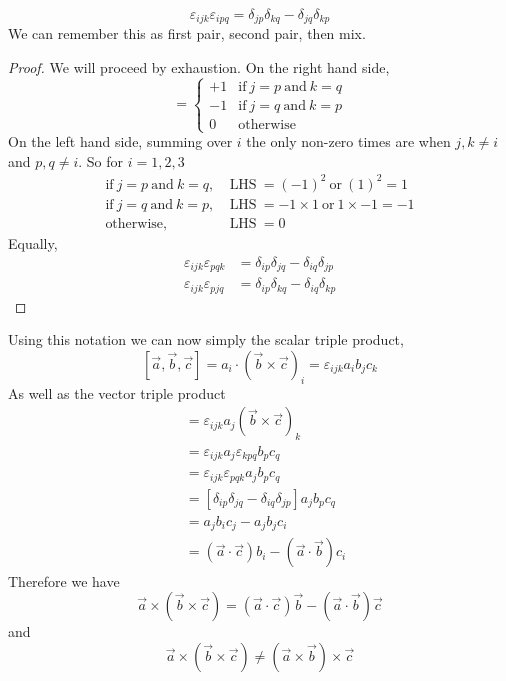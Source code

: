 \documentclass{article}
\numberwithin{equation}{section}
\begin{document}
\begin{remark}
    \begin{equation}
        \varepsilon_{ijk} \varepsilon_{ipq} = \delta_{jp} \delta_{kq} - \delta_{jq} \delta_{kp}   
    \end{equation}
    We can remember this as first pair, second pair, then mix.
\end{remark}

\begin{proof}
    We will proceed by exhaustion. On the right hand side,
    \[
    = \begin{cases} 
    +1 & \text{if} \ j = p \ \text{and} \ k = q \\
    -1 & \text{if} \ j = q \ \text{and} \ k = p \\
    0 & \text{otherwise}
    \end{cases}    
    \]
    On the left hand side, summing over $i$ the only non-zero times are when $j, k \neq i$ and $p, q \neq i$. So for $i = 1, 2, 3$
    \begin{align*}
        \text{if} \ j = p \ \text{and} \ k = q, & \ \text{LHS} \ = (-1)^2 \ \text{or} \ (1)^2 = 1 \\
        \text{if} \ j = q \ \text{and} \ k = p, & \ \text{LHS} \ = -1 \times 1 \ \text{or} \ 1 \times -1 = -1 \\
        \text{otherwise}, \qquad & \ \text{LHS} \ = 0
    \end{align*}
    Equally, 
    \begin{align*}
        \varepsilon_{ijk} \varepsilon_{pqk} &= \delta_{ip} \delta_{jq} - \delta_{iq} \delta_{jp} \\
        \varepsilon_{ijk} \varepsilon_{pjq} &= \delta_{ip} \delta_{kq} - \delta_{iq} \delta_{kp}   
    \end{align*}
\end{proof}

Using this notation we can now simply the scalar triple product,
\[
    [\vec{a}, \vec{b}, \vec{c}] = a_i \cdot (\vec{b} \times \vec{c})_i = \varepsilon_{ijk}a_ib_jc_k
\]
As well as the vector triple product
\begin{align*}
    [\vec{a} \times (\vec{b} \times \vec{c})] &= \varepsilon_{ijk}a_j(\vec{b} \times \vec{c})_k \\
    &= \varepsilon_{ijk}a_j \varepsilon_{kpq}b_pc_q \\
    &= \varepsilon_{ijk}\varepsilon_{pqk}a_j b_pc_q \\
    &= [\delta_{ip} \delta_{jq} - \delta_{iq} \delta_{jp}]a_j b_pc_q \\
    &= a_jb_ic_j - a_jb_jc_i \\
    &= (\vec{a} \cdot \vec{c})b_i - (\vec{a} \cdot \vec{b}) c_i
\end{align*}
Therefore we have
\begin{equation}
    \vec{a} \times (\vec{b} \times \vec{c}) = (\vec{a} \cdot \vec{c})\vec{b} - (\vec{a} \cdot \vec{b})\vec{c}
\end{equation}
and 
\begin{equation}
    \vec{a} \times (\vec{b} \times \vec{c}) \neq (\vec{a} \times \vec{b}) \times \vec{c}
\end{equation}
\end{document}
